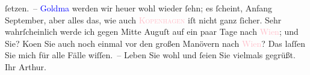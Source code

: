                ſetzen. –\pend
           \pstart
           \textcolor{blue}{Goldma{\geminationn}}{}\ledrightnote{\textcolor{blue}{Paul Goldmann}} werden wir heuer wohl wieder ſehn; es ſcheint, Anfang September,
               aber alles das, wie auch \textcolor{pink}{\textsc{Kopenhagen}}{}\ledrightnote{\textcolor{pink}{Kopenhagen}} iſt nicht ganz ſicher. Sehr wahrſcheinlich werde ich gegen Mitte
                  Auguſt auf ein paar Tage nach \textcolor{pink}{Wien}{}\ledrightnote{\textcolor{pink}{Wien}}; und
               Sie? Ko{\geminationm}en Sie auch noch einmal vor den großen Manövern
               nach \textcolor{pink}{Wien}{}\ledrightnote{\textcolor{pink}{Wien}}? Das {\pb}laſſen
               Sie mich für alle Fälle wiſſen. –\pend
           \pstart
           Leben Sie wohl und ſeien Sie vielmals gegrüßt.\pend
           \pstart Ihr \spacefill\mbox{Arthur.}\pend{}\endnumbering{}  
      